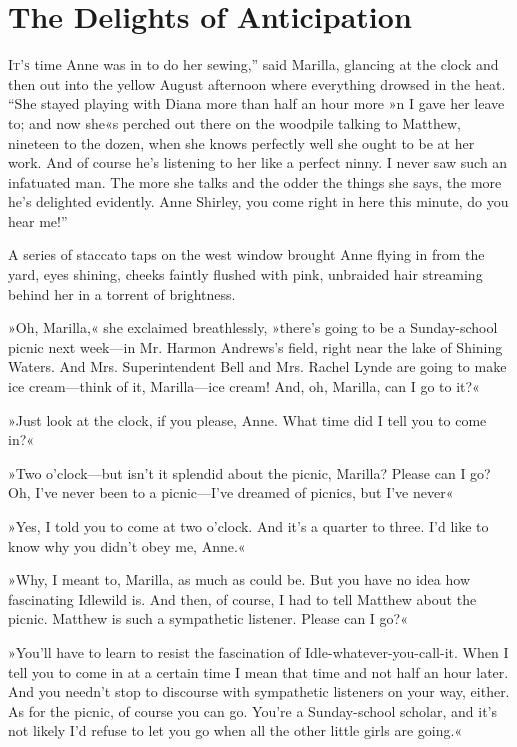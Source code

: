 \chapter{The Delights of Anticipation}

\lettrine[ante=“,lines=4]{I}{t's} time Anne was in to do her sewing,” said Marilla, glancing at the clock and then out into the yellow August afternoon where everything drowsed in the heat. “She stayed playing with Diana more than half an hour more »n I gave her leave to; and now she«s perched out there on the woodpile talking to Matthew, nineteen to the dozen, when she knows perfectly well she ought to be at her work. And of course he's listening to her like a perfect ninny. I never saw such an infatuated man. The more she talks and the odder the things she says, the more he's delighted evidently. Anne Shirley, you come right in here this minute, do you hear me!”

A series of staccato taps on the west window brought Anne flying in from the yard, eyes shining, cheeks faintly flushed with pink, unbraided hair streaming behind her in a torrent of brightness.

»Oh, Marilla,« she exclaimed breathlessly, »there's going to be a Sunday-school picnic next week—in Mr. Harmon Andrews's field, right near the lake of Shining Waters. And Mrs. Superintendent Bell and Mrs. Rachel Lynde are going to make ice cream—think of it, Marilla—ice cream! And, oh, Marilla, can I go to it?«

»Just look at the clock, if you please, Anne. What time did I tell you to come in?«

»Two o'clock—but isn't it splendid about the picnic, Marilla? Please can I go? Oh, I've never been to a picnic—I've dreamed of picnics, but I've never\longdash«

»Yes, I told you to come at two o'clock. And it's a quarter to three. I'd like to know why you didn't obey me, Anne.«

»Why, I meant to, Marilla, as much as could be. But you have no idea how fascinating Idlewild is. And then, of course, I had to tell Matthew about the picnic. Matthew is such a sympathetic listener. Please can I go?«

»You'll have to learn to resist the fascination of Idle-whatever-you-call-it. When I tell you to come in at a certain time I mean that time and not half an hour later. And you needn't stop to discourse with sympathetic listeners on your way, either. As for the picnic, of course you can go. You're a Sunday-school scholar, and it's not likely I'd refuse to let you go when all the other little girls are going.«

